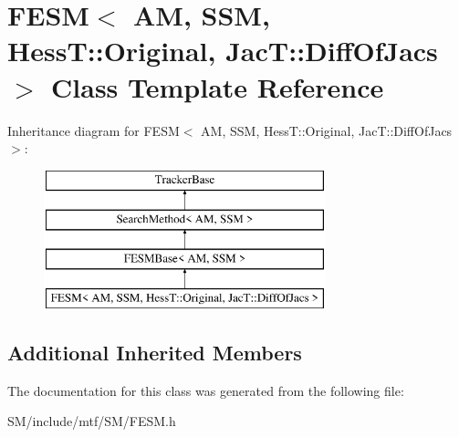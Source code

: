 \hypertarget{classFESM_3_01AM_00_01SSM_00_01HessT_1_1Original_00_01JacT_1_1DiffOfJacs_01_4}{\section{F\-E\-S\-M$<$ A\-M, S\-S\-M, Hess\-T\-:\-:Original, Jac\-T\-:\-:Diff\-Of\-Jacs $>$ Class Template Reference}
\label{classFESM_3_01AM_00_01SSM_00_01HessT_1_1Original_00_01JacT_1_1DiffOfJacs_01_4}
}
Inheritance diagram for F\-E\-S\-M$<$ A\-M, S\-S\-M, Hess\-T\-:\-:Original, Jac\-T\-:\-:Diff\-Of\-Jacs $>$\-:\begin{figure}[H]
\begin{center}
\leavevmode
\includegraphics[height=4.000000cm]{classFESM_3_01AM_00_01SSM_00_01HessT_1_1Original_00_01JacT_1_1DiffOfJacs_01_4}
\end{center}
\end{figure}
\subsection*{Additional Inherited Members}


The documentation for this class was generated from the following file\-:\begin{DoxyCompactItemize}
\item 
S\-M/include/mtf/\-S\-M/F\-E\-S\-M.\-h\end{DoxyCompactItemize}
